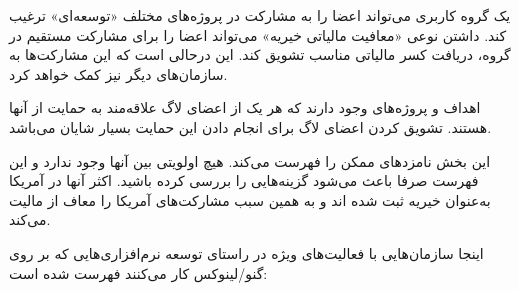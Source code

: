 یک گروه کاربری می‌تواند اعضا را به مشارکت در پروژه‌های مختلف «توسعه‌ای» ترغیب کند. 
داشتن نوعی «معافیت مالیاتی خیریه» می‌تواند اعضا را برای مشارکت مستقیم در گروه،
دریافت کسر مالیاتی مناسب تشویق کند. این درحالی است که این مشارکت‌ها
به سازمان‌های دیگر نیز کمک خواهد کرد.

اهداف و پروژه‌های وجود دارند که هر یک از اعضای لاگ علاقه‌مند به حمایت از آنها هستند.
تشویق کردن اعضای لاگ برای انجام دادن این حمایت بسیار شایان می‌باشد.

این بخش نامزد‌های ممکن را فهرست می‌کند. هیچ اولویتی بین آنها وجود ندارد و این فهرست
صرفا باعث می‌شود گزینه‌هایی را بررسی کرده باشید. اکثر آنها در آمریکا به‌عنوان
خیریه ثبت شده اند و به همین سبب مشارکت‌های آمریکا را معاف از مالیت می‌کند.

اینجا سازمان‌هایی با فعالیت‌های ویژه در راستای توسعه نرم‌افزاری‌هایی که
بر روی گنو/لینوکس کار می‌کنند فهرست شده است:

